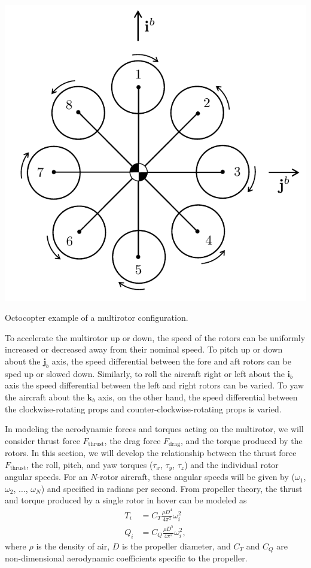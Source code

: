 \begin{marginfigure}
\includegraphics{chap3_multirotor/figures/eom-octo-std-def}
\caption{Octocopter example of a multirotor configuration.} 
\label{fig:eom-octo-std-def}
\end{marginfigure}
%

To accelerate the multirotor up or down, the speed of the rotors can be uniformly increased or decreased away from their nominal speed. To pitch up or down about the $\mathbf{j}_b$ axis, the speed differential between the fore and aft rotors can be sped up or slowed down. Similarly, to roll the aircraft right or left about the $\mathbf{i}_b$ axis the speed differential between the left and right rotors can be varied. To yaw the aircraft about the $\mathbf{k}_b$ axis, on the other hand, the speed differential between the clockwise-rotating props and counter-clockwise-rotating props is varied.

In modeling the aerodynamic forces and torques acting on the multirotor, we will consider thrust force $F_\text{thrust}$, the drag force $F_\text{drag}$, and the torque produced by the rotors. In this section, we will develop the relationship between the thrust force $F_{\text{thrust}}$, the roll, pitch, and yaw torques ($\tau_x$, $\tau_y$, $\tau_z$) and the individual rotor angular speeds. For an $N$-rotor aircraft, these angular speeds will be given by ($\omega_1$, $\omega_2$, $\ldots$, $\omega_N$) and specified in radians per second. From propeller theory, the thrust and torque produced by a single rotor in hover can be modeled as
\begin{align}
	T_i &= C_T \frac{\rho D^4}{4\pi^2} \omega_i^2	\\
	Q_i &= C_Q \frac{\rho D^5}{4\pi^2} \omega_i^2,	
\end{align}
where $\rho$ is the density of air, $D$ is the propeller diameter, and $C_T$ and $C_Q$ are non-dimensional aerodynamic coefficients specific to the propeller. 




